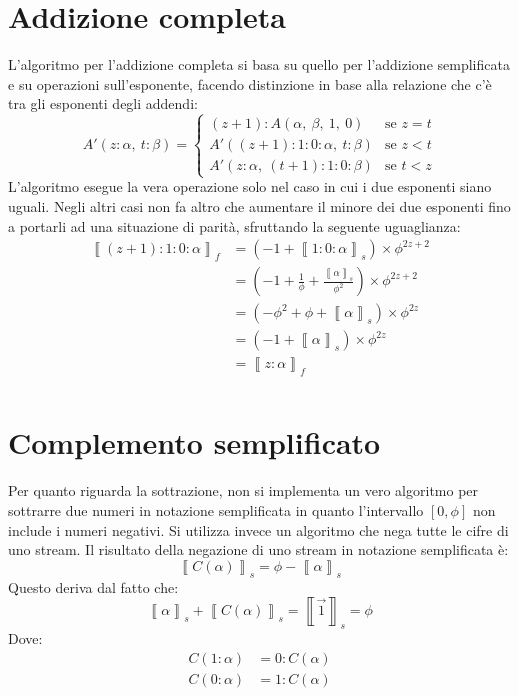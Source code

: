 \documentclass[Lau]{sapthesis}
\begin{document}
\section{Addizione completa}
L'algoritmo per l'addizione completa si basa su quello per l'addizione semplificata e su operazioni sull'esponente, facendo distinzione in base alla relazione che c'è tra gli esponenti degli addendi:
\begin{equation*}
A'(z:\alpha, \ t:\beta) = \begin{cases}
(z+1):A(\alpha, \ \beta, \ 1, \ 0) & \text{se $z=t$}\\
A'((z+1):1:0:\alpha, \ t:\beta) & \text{se $z<t$}\\
A'(z:\alpha, \ (t+1):1:0:\beta) & \text{se $t<z$}
\end{cases}
\end{equation*}
L'algoritmo esegue la vera operazione solo nel caso in cui i due esponenti siano uguali. Negli altri casi non fa altro che aumentare il minore dei due esponenti fino a portarli ad una situazione di parità, sfruttando la seguente uguaglianza:
\begin{align*}
\left\llbracket (z+1):1:0:\alpha \right\rrbracket_f & = \left( - 1 + \left\llbracket 1:0:\alpha \right\rrbracket_s \right) \times \phi^{2z+2}\\
& = \left( - 1 + \frac{1}{\phi} + \frac{\left\llbracket \alpha \right\rrbracket_s}{\phi^2} \right) \times \phi^{2z+2}\\
& = \left( - \phi^2 + \phi + \left\llbracket \alpha \right\rrbracket_s \right) \times \phi^{2z}\\
& = \left( - 1 + \left\llbracket \alpha \right\rrbracket_s \right) \times \phi^{2z}\\
& = \left\llbracket z:\alpha \right\rrbracket_f\\
\end{align*}


\section{Complemento semplificato}
Per quanto riguarda la sottrazione, non si implementa un vero algoritmo per sottrarre due numeri in notazione semplificata in quanto l'intervallo $\left[0,\phi\right]$ non include i numeri negativi. Si utilizza invece un algoritmo che nega tutte le cifre di uno stream. Il risultato della negazione di uno stream in notazione semplificata è:
$$\left\llbracket C(\alpha) \right\rrbracket_s = \phi - \left\llbracket \alpha \right\rrbracket_s$$
Questo deriva dal fatto che:
$$\left\llbracket \alpha \right\rrbracket_s + \left\llbracket C(\alpha) \right\rrbracket_s = \left\llbracket \overrightarrow{1} \right\rrbracket_s = \phi$$
Dove:
\begin{align*}
C(1:\alpha) & = 0:C(\alpha)\\
C(0:\alpha) & = 1:C(\alpha)\\
\end{align*}
\end{document}
